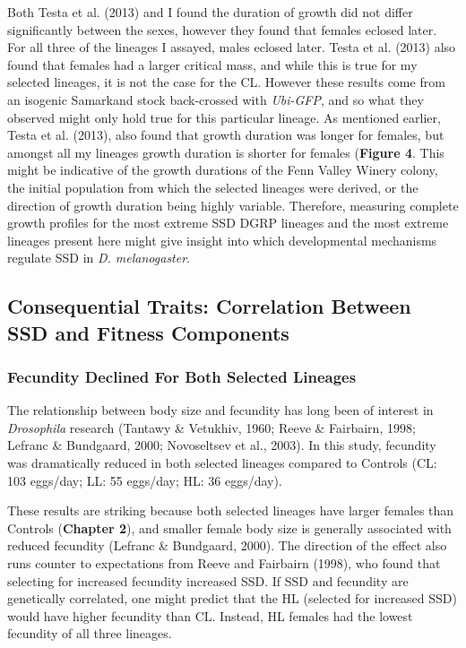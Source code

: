 \documentclass[12pt,reqno,oneside]{report}
\begin{document}
Both Testa et al. (2013) and I found the duration of growth did not differ significantly between the sexes, however they found that females eclosed later. For all three of the lineages I assayed, males eclosed later. Testa et al. (2013) also found that females had a larger critical mass, and while this is true for my selected lineages, it is not the case for the CL. However these results come from an isogenic Samarkand stock back-crossed with \textit{Ubi-GFP}, and so what they observed might only hold true for this particular lineage. As mentioned earlier, Testa et al. (2013), also found that growth duration was longer for females, but amongst all my lineages growth duration is shorter for females (\textbf{Figure 4}. This might be indicative of the growth durations of the Fenn Valley Winery colony, the initial population from which the selected lineages were derived, or the direction of growth duration being highly variable. Therefore, measuring complete growth profiles for the most extreme SSD DGRP lineages and the most extreme lineages present here might give insight into which developmental mechanisms regulate SSD in \textit{D. melanogaster}.

\subsection{Consequential Traits: Correlation Between SSD and Fitness Components}

\subsubsection{Fecundity Declined For Both Selected Lineages}

The relationship between body size and fecundity has long been of interest in \textit{Drosophila} research (Tantawy \& Vetukhiv, 1960; Reeve \& Fairbairn, 1998; Lefranc \& Bundgaard, 2000; Novoseltsev et al., 2003). In this study, fecundity was dramatically reduced in both selected lineages compared to Controls (CL: 103 eggs/day; LL: 55 eggs/day; HL: 36 eggs/day).

These results are striking because both selected lineages have larger females than Controls (\textbf{Chapter 2}), and smaller female body size is generally associated with reduced fecundity (Lefranc \& Bundgaard, 2000). The direction of the effect also runs counter to expectations from Reeve and Fairbairn (1998), who found that selecting for increased fecundity increased SSD. If SSD and fecundity are genetically correlated, one might predict that the HL (selected for increased SSD) would have higher fecundity than CL. Instead, HL females had the lowest fecundity of all three lineages.
\end{document}
